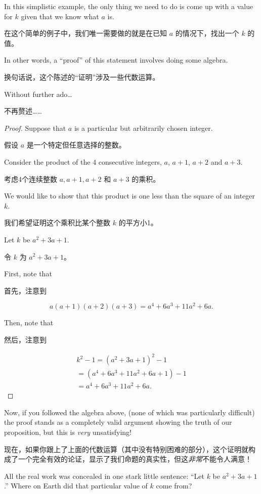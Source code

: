 In this simplistic example, the only thing we need to do is come 
up with a value for $k$ given that we know what $a$ is.

在这个简单的例子中，我们唯一需要做的就是在已知 $a$ 的情况下，找出一个 $k$ 的值。

In other 
words, a ``proof'' of this statement involves doing some algebra.

换句话说，这个陈述的“证明”涉及一些代数运算。

Without further ado\ldots

不再赘述……

\begin{proof}
Suppose that $a$ is a particular but arbitrarily chosen 
integer.

假设 $a$ 是一个特定但任意选择的整数。

Consider the product of the 4 consecutive integers, $a$, 
$a+1$, $a+2$ and $a+3$.

考虑4个连续整数 $a, a+1, a+2$ 和 $a+3$ 的乘积。

We would like to show that this product is 
one less than the square of an integer $k$.

我们希望证明这个乘积比某个整数 $k$ 的平方小1。

Let $k$ be $a^2+3a+1$.  

令 $k$ 为 $a^2+3a+1$。

First, note that 

首先，注意到

\[  a(a+1)(a+2)(a+3) = a^4 + 6a^3 + 11a^2 + 6a.
\]

Then, note that

然后，注意到

\begin{gather*} 
k^2 - 1 = (a^2 + 3a +1)^2 - 1 \\
= (a^4  + 6a^3 + 11a^2 + 6a + 1) - 1 \\
= a^4 + 6a^3 + 11a^2 + 6a.
\end{gather*}

\end{proof} 

Now, if you followed the algebra above, (none of which was particularly 
difficult) the proof stands as a completely valid argument showing the 
truth of our proposition, but this is \emph{very} unsatisfying!

现在，如果你跟上了上面的代数运算（其中没有特别困难的部分），这个证明就构成了一个完全有效的论证，显示了我们命题的真实性，但这\emph{非常}不能令人满意！

All 
the real work was concealed in one stark little sentence:
``Let $k$ be $a^2+3a+1$.''   Where on Earth did that particular value 
of $k$ come from?

